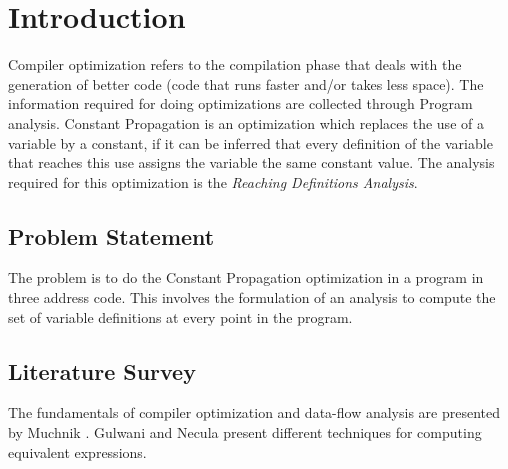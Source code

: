 \chapter{Introduction}
Compiler optimization refers to the compilation phase that deals with the  generation of better code (code that runs faster and/or takes less space). The information required for doing optimizations are collected through Program analysis. Constant Propagation is an optimization which replaces the use of a variable by a constant, if it can be inferred that every definition of the variable that reaches this use assigns the variable the same constant value. The analysis required for this optimization is the \textit{Reaching Definitions Analysis}. 
\section{Problem Statement}
The problem is to do the Constant Propagation optimization in a program in three address code. This involves the formulation of an analysis to compute the set of variable definitions at every point in the program.
\section{Literature Survey }
The fundamentals of compiler optimization and data-flow analysis are presented by Muchnik  \cite{much}. Gulwani and Necula \cite{sumit} present different techniques for computing equivalent expressions.

